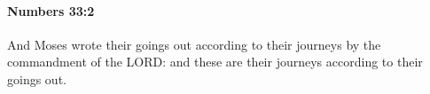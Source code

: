
		\paragraph{Numbers 33:2} %
			\label{NUMBERS-33-2}

			And Moses wrote their goings out according to their journeys by the commandment of the LORD: and these are their journeys according to their goings out.


